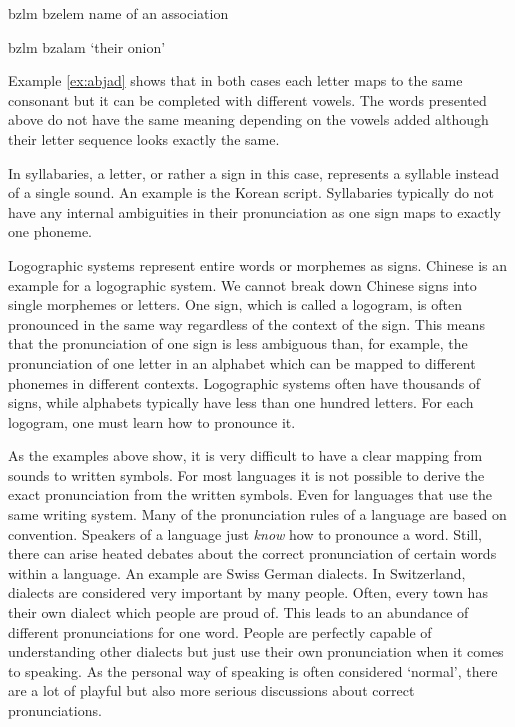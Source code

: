 \begin{description}
\begin{covsubexamples}[preamble={The example shows Hebrew words that are first mapped to the Latin alphabet, then to the Latin alphabet including vowels and in the end to the English translation.}]
\label{ex:abjad}
\item {} \>\> bzlm \>\> bzelem \>\> name of an association
\item {} \>\> bzlm \>\> bzalam \>\> `their onion'
\end{covsubexamples}

Example \ref{ex:abjad} shows that in both cases each letter maps to the same consonant but it can be completed with different vowels. The words presented above do not have the same meaning depending on the vowels added although their letter sequence looks exactly the same. 

\item[\textsc{Syllabary}] In syllabaries, a letter, or rather a sign in this case, represents a syllable instead of a single sound. An example is the Korean script. Syllabaries typically do not have any internal ambiguities in their pronunciation as one sign maps to exactly one phoneme.   

\item[\textsc{Logographic systems}] Logographic systems represent entire words or morphemes as signs. Chinese is an example for a logographic system. We cannot break down Chinese signs into single morphemes or letters. One sign, which is called a logogram, is often pronounced in the same way regardless of the context of the sign. This means that the pronunciation of one sign is less ambiguous than, for example, the pronunciation of one letter in an alphabet which can be mapped to different phonemes in different contexts. Logographic systems often have thousands of signs, while alphabets typically have less than one hundred letters. For each logogram, one must learn how to pronounce it.
\end{description}

As the examples above show, it is very difficult to have a clear mapping from sounds to written symbols. For most languages it is not possible to derive the exact pronunciation from the written symbols. Even for languages that use the same writing system. Many of the pronunciation rules of a language are based on convention. Speakers of a language just \textit{know} how to pronounce a word. Still, there can arise heated debates about the correct pronunciation of certain words within a language. An example are Swiss German dialects. In Switzerland, dialects are considered very important by many people. Often, every town has their own dialect which people are proud of. This leads to an abundance of different pronunciations for one word. People are perfectly capable of understanding other dialects but just use their own pronunciation when it comes to speaking. As the personal way of speaking is often considered `normal', there are a lot of playful but also more serious discussions about correct pronunciations. 

